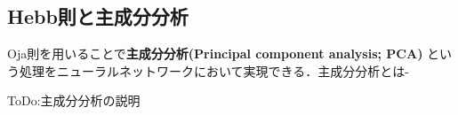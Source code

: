 \subsection{Hebb則と主成分分析}
Oja則を用いることで\textbf{主成分分析(Principal component analysis; PCA)} という処理をニューラルネットワークにおいて実現できる．主成分分析とは-

ToDo:主成分分析の説明
